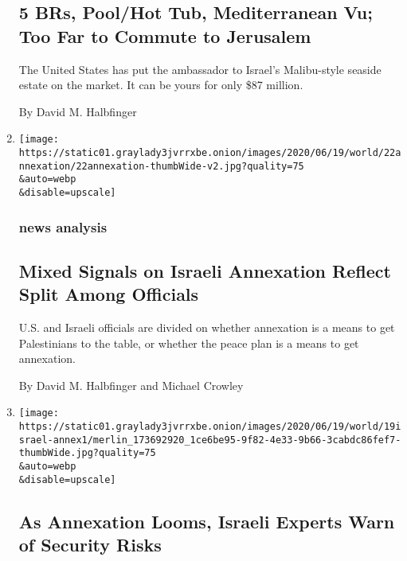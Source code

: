 \begin{enumerate}
  \hypertarget{5-brs-poolhot-tub-mediterranean-vu-too-far-to-commute-to-jerusalem}{%
  \subsection{5 BRs, Pool/Hot Tub, Mediterranean Vu; Too Far to Commute
  to
  Jerusalem}\label{5-brs-poolhot-tub-mediterranean-vu-too-far-to-commute-to-jerusalem}}

  The United States has put the ambassador to Israel's Malibu-style
  seaside estate on the market. It can be yours for only \$87 million.

  By David M. Halbfinger
\item
  \href{/2020/06/22/world/middleeast/israel-annexation-trump-kushner.html}{}

  \texttt{[image: https://static01.graylady3jvrrxbe.onion/images/2020/06/19/world/22annexation/22annexation-thumbWide-v2.jpg?quality=75\\\&auto=webp\\\&disable=upscale]}

  \hypertarget{news-analysis}{%
  \subsubsection{news analysis}\label{news-analysis}}

  \hypertarget{mixed-signals-on-israeli-annexation-reflect-split-among-officials}{%
  \subsection{Mixed Signals on Israeli Annexation Reflect Split Among
  Officials}\label{mixed-signals-on-israeli-annexation-reflect-split-among-officials}}

  U.S. and Israeli officials are divided on whether annexation is a
  means to get Palestinians to the table, or whether the peace plan is a
  means to get annexation.

  By David M. Halbfinger and Michael Crowley
\item
  \href{/2020/06/19/world/middleeast/isael-annexation-west-bank-risks.html}{}

  \texttt{[image: https://static01.graylady3jvrrxbe.onion/images/2020/06/19/world/19israel-annex1/merlin\_173692920\_1ce6be95-9f82-4e33-9b66-3cabdc86fef7-thumbWide.jpg?quality=75\\\&auto=webp\\\&disable=upscale]}

  \hypertarget{as-annexation-looms-israeli-experts-warn-of-security-risks}{%
  \subsection{As Annexation Looms, Israeli Experts Warn of Security
  Risks}\label{as-annexation-looms-israeli-experts-warn-of-security-risks}}


\end{enumerate}
